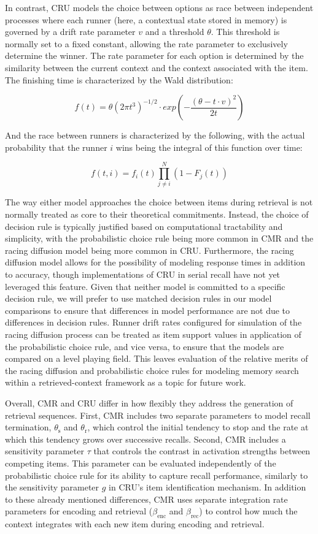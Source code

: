 \documentclass[
  letterpaper,
  DIV=11,
  numbers=noendperiod]{scrartcl}
\begin{document}
In contrast, CRU models the choice between options as race between
independent processes where each runner (here, a contextual state stored
in memory) is governed by a drift rate parameter \(v\) and a threshold
\(\theta\). This threshold is normally set to a fixed constant, allowing
the rate parameter to exclusively determine the winner. The rate
parameter for each option is determined by the similarity between the
current context and the context associated with the item. The finishing
time is characterized by the Wald distribution:

\[
f(t) = \theta (2 \pi t^3)^{-1/2} \cdot exp(-\frac{(\theta - t \cdot v)^2}{2t})
\]

And the race between runners is characterized by the following, with the
actual probability that the runner \(i\) wins being the integral of this
function over time:

\[
f(t, i) = {f_i}(t) \prod_{j \neq i}^{N} (1 - F_j(t))
\]

The way either model approaches the choice between items during
retrieval is not normally treated as core to their theoretical
commitments. Instead, the choice of decision rule is typically justified
based on computational tractability and simplicity, with the
probabilistic choice rule being more common in CMR and the racing
diffusion model being more common in CRU. Furthermore, the racing
diffusion model allows for the possibility of modeling response times in
addition to accuracy, though implementations of CRU in serial recall
have not yet leveraged this feature. Given that neither model is
committed to a specific decision rule, we will prefer to use matched
decision rules in our model comparisons to ensure that differences in
model performance are not due to differences in decision rules. Runner
drift rates configured for simulation of the racing diffusion process
can be treated as item support values in application of the
probabilistic choice rule, and vice versa, to ensure that the models are
compared on a level playing field. This leaves evaluation of the
relative merits of the racing diffusion and probabilistic choice rules
for modeling memory search within a retrieved-context framework as a
topic for future work.

Overall, CMR and CRU differ in how flexibly they address the generation
of retrieval sequences. First, CMR includes two separate parameters to
model recall termination, \(\theta_\text{s}\) and \(\theta_\text{r}\),
which control the initial tendency to stop and the rate at which this
tendency grows over successive recalls. Second, CMR includes a
sensitivity parameter \(\tau\) that controls the contrast in activation
strengths between competing items. This parameter can be evaluated
independently of the probabilistic choice rule for its ability to
capture recall performance, similarly to the sensitivity parameter \(g\)
in CRU's item identification mechanism. In addition to these already
mentioned differences, CMR uses separate integration rate parameters for
encoding and retrieval (\(\beta_\text{enc}\) and \(\beta_\text{rec}\))
to control how much the context integrates with each new item during
encoding and retrieval.
\end{document}
